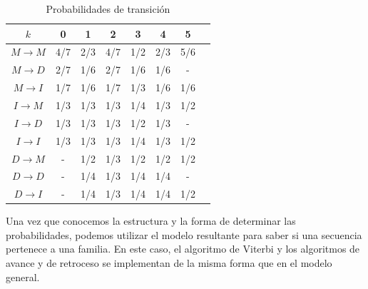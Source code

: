 \begin{exampleth}
\begin{table}[H]
    \centering
    \begin{tabular}{|c|C|C|C|C|C|C|C|}
        \hline
        $k$ & 0 & 1 & 2 & 3 & 4 & 5  \\
        \hline
        $M\rightarrow M$ & 4/7 & 2/3 & 4/7 & 1/2 & 2/3 & 5/6\\
        $M\rightarrow D$ & 2/7 & 1/6 & 2/7 & 1/6 & 1/6 & - \\
        $M\rightarrow I$ & 1/7 & 1/6 & 1/7 & 1/3 & 1/6 & 1/6 \\
        \hline
        $I\rightarrow M$ & 1/3 & 1/3 & 1/3 & 1/4 & 1/3 & 1/2 \\
        $I\rightarrow D$ & 1/3 & 1/3 & 1/3 & 1/2 & 1/3 & - \\
        $I\rightarrow I$ & 1/3 & 1/3 & 1/3 & 1/4 & 1/3 & 1/2 \\
        \hline
        $D\rightarrow M$ & - & 1/2 & 1/3 & 1/2 & 1/2 & 1/2 \\
        $D\rightarrow D$ & - & 1/4 & 1/3 & 1/4 & 1/4 & - \\
        $D\rightarrow I$ & - & 1/4 & 1/3 & 1/4 & 1/4 & 1/2 \\
        \hline
    \end{tabular}
    \caption{Probabilidades de transición}
\end{table}
    
\end{exampleth}

Una vez que conocemos la estructura y la forma de determinar las probabilidades, podemos utilizar el modelo resultante para saber si una secuencia pertenece a una familia. En este caso, el algoritmo de Viterbi y los algoritmos de avance y de retroceso se implementan de la misma forma que en el modelo general.
